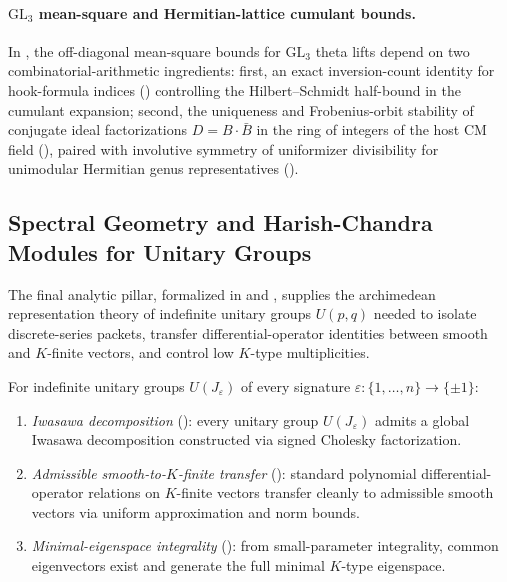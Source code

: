 \paragraph{$\mathrm{GL}_3$ mean-square and Hermitian-lattice cumulant bounds.}
In , the off-diagonal mean-square bounds for
$\mathrm{GL}_3$ theta lifts depend on two combinatorial-arithmetic ingredients:
first, an exact inversion-count identity for hook-formula indices
()
controlling the Hilbert--Schmidt half-bound in the cumulant expansion; second,
the uniqueness and Frobenius-orbit stability of conjugate ideal factorizations
$D = B \cdot \bar{B}$ in the ring of integers of the host CM field
(),
paired with involutive symmetry of uniformizer divisibility for unimodular
Hermitian genus representatives
().

\subsection{Spectral Geometry and Harish-Chandra Modules for Unitary Groups}
\label{subsec:ch03-spectral-harish-chandra}

The final analytic pillar, formalized in
 and
, supplies the archimedean
representation theory of indefinite unitary groups $U(p, q)$ needed to isolate
discrete-series packets, transfer differential-operator identities between
smooth and $K$-finite vectors, and control low $K$-type multiplicities.

\begin{theorem}
\label{thm:ch03-hc-transfer}
For indefinite unitary groups $U(J_\varepsilon)$ of every signature
$\varepsilon : \{1, \dots, n\} \to \{\pm 1\}$:
\begin{enumerate}
  \item \emph{Iwasawa decomposition}
        ():
        every unitary group $U(J_\varepsilon)$ admits a global Iwasawa
        decomposition constructed via signed Cholesky factorization.
  \item \emph{Admissible smooth-to-$K$-finite transfer}
        ():
        standard polynomial differential-operator relations on $K$-finite
        vectors transfer cleanly to admissible smooth vectors via uniform
        approximation and norm bounds.
  \item \emph{Minimal-eigenspace integrality}
        ():
        from small-parameter integrality, common eigenvectors exist and
        generate the full minimal $K$-type eigenspace.
\end{enumerate}
\end{theorem}

